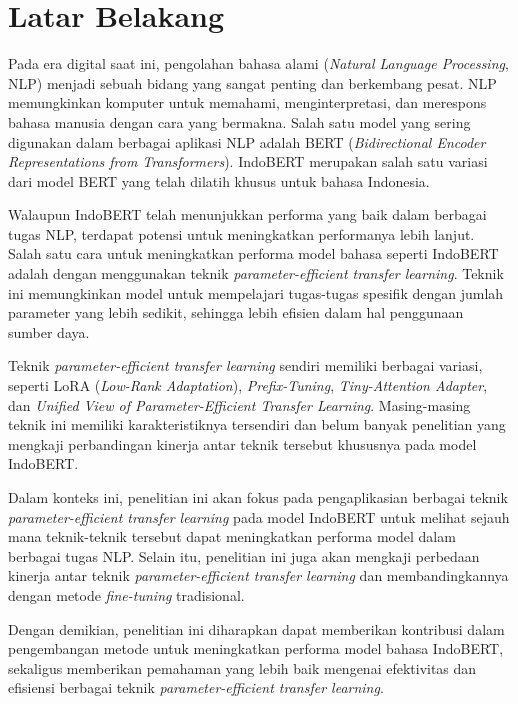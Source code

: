 \section{Latar Belakang}

Pada era digital saat ini, pengolahan bahasa alami (\textit{Natural Language Processing}, NLP) menjadi sebuah bidang yang sangat penting dan berkembang pesat. NLP memungkinkan komputer untuk memahami, menginterpretasi, dan merespons bahasa manusia dengan cara yang bermakna. Salah satu model yang sering digunakan dalam berbagai aplikasi NLP adalah BERT (\textit{Bidirectional Encoder Representations from Transformers}). IndoBERT merupakan salah satu variasi dari model BERT yang telah dilatih khusus untuk bahasa Indonesia.

Walaupun IndoBERT telah menunjukkan performa yang baik dalam berbagai tugas NLP, terdapat potensi untuk meningkatkan performanya lebih lanjut. Salah satu cara untuk meningkatkan performa model bahasa seperti IndoBERT adalah dengan menggunakan teknik \textit{parameter-efficient transfer learning}. Teknik ini memungkinkan model untuk mempelajari tugas-tugas spesifik dengan jumlah parameter yang lebih sedikit, sehingga lebih efisien dalam hal penggunaan sumber daya.

Teknik \textit{parameter-efficient transfer learning} sendiri memiliki berbagai variasi, seperti LoRA (\textit{Low-Rank Adaptation}), \textit{Prefix-Tuning}, \textit{Tiny-Attention Adapter}, dan \textit{Unified View of Parameter-Efficient Transfer Learning}. Masing-masing teknik ini memiliki karakteristiknya tersendiri dan belum banyak penelitian yang mengkaji perbandingan kinerja antar teknik tersebut khususnya pada model IndoBERT.

Dalam konteks ini, penelitian ini akan fokus pada pengaplikasian berbagai teknik \textit{parameter-efficient transfer learning} pada model IndoBERT untuk melihat sejauh mana teknik-teknik tersebut dapat meningkatkan performa model dalam berbagai tugas NLP. Selain itu, penelitian ini juga akan mengkaji perbedaan kinerja antar teknik \textit{parameter-efficient transfer learning} dan membandingkannya dengan metode \textit{fine-tuning} tradisional.

Dengan demikian, penelitian ini diharapkan dapat memberikan kontribusi dalam pengembangan metode untuk meningkatkan performa model bahasa IndoBERT, sekaligus memberikan pemahaman yang lebih baik mengenai efektivitas dan efisiensi berbagai teknik \textit{parameter-efficient transfer learning}.